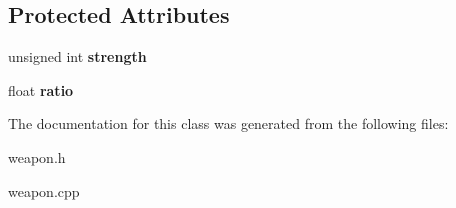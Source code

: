 \subsection*{Protected Attributes}
\begin{DoxyCompactItemize}
\item 
\hypertarget{classda__game_1_1Weapon_ac616cc0adf463730be8f90175b958309}{
unsigned int {\bfseries strength}}
\label{classda__game_1_1Weapon_ac616cc0adf463730be8f90175b958309}

\item 
\hypertarget{classda__game_1_1Weapon_ad712d94d84353fdae7dc4c0a82b52d91}{
float {\bfseries ratio}}
\label{classda__game_1_1Weapon_ad712d94d84353fdae7dc4c0a82b52d91}

\end{DoxyCompactItemize}


The documentation for this class was generated from the following files:\begin{DoxyCompactItemize}
\item 
weapon.h\item 
weapon.cpp\end{DoxyCompactItemize}
